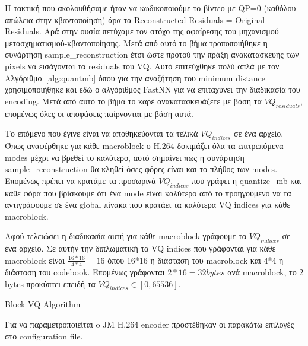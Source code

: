 \indent Η τακτική που ακολουθήσαμε ήταν να κωδικοποιούμε το βίντεο με QP=0 (καθόλου απώλεια στην κβαντοποίηση) άρα τα Reconstructed Residuals = Original Residuals. Αρά στην ουσία πετύχαμε τον στόχο της αφαίρεσης του μηχανισμού μετασχηματισμού-κβαντοποίησης. Μετά από αυτό το βήμα τροποποιήθηκε η συνάρτηση sample\_reconstruction έτσι ώστε προτού την πράξη ανακατασκευής των pixels να εισάγονται τα residuals του VQ. Αυτό επιτεύχθηκε πολύ απλά με τον Αλγόριθμο~\ref{alg:quantmb} όπου για την αναζήτηση του minimum distance χρησιμοποιήθηκε και εδώ ο αλγόριθμος FastNN για να επιταχύνει την διαδικασία του encoding. Μετά από αυτό το βήμα το καρέ ανακατασκευάζετε με βάση τα $VQ_{residuals}$, επομένως όλες οι αποφάσεις παίρνονται με βάση αυτά.

\indent Το επόμενο που έγινε είναι να αποθηκεύονται τα τελικά $VQ_{indices}$ σε ένα αρχείο. Όπως αναφέρθηκε για κάθε macroblock ο H.264 δοκιμάζει όλα τα επιτρεπόμενα modes μέχρι να βρεθεί το καλύτερο, αυτό σημαίνει πως η συνάρτηση sample\_reconstruction θα κληθεί όσες φόρες είναι και το πλήθος των modes. Επομένως πρέπει να κρατάμε τα προσωρινά $VQ_{indices}$ που γράφει η quantize\_mb και κάθε φόρα που βρίσκουμε ότι ένα mode είναι καλύτερο από το προηγούμενο να τα αντιγράφουμε σε ένα global πίνακα που κρατάει τα καλύτερα VQ indices για κάθε macroblock.

\indent Αφού τελειώσει η διαδικασία αυτή για κάθε macroblock γράφουμε τα $VQ_{indices}$ σε ένα αρχείο. Σε αυτήν την διπλωματική τα VQ indices που γράφονται για κάθε macroblock είναι $\frac{16*16}{4*4}=16$ όπου 16*16 η διάσταση του macroblock και 4*4 η διάσταση του codebook. Επομένως γράφονται $2*16 = 32bytes$ ανά macroblock, το 2 bytes προκύπτει επειδή τα $VQ_{indices}\in[0,65536]$.

\begin{algorithm}[H]

\begin{algorithmic}[1]
\EndFor
\EndFunction
\end{algorithmic}
\caption{Block VQ Algorithm}
\label{alg:quantmb}
\end{algorithm}

\indent Για να παραμετροποιείται o JM Η.264 encoder προστέθηκαν οι παρακάτω επιλογές στο configuration file.

